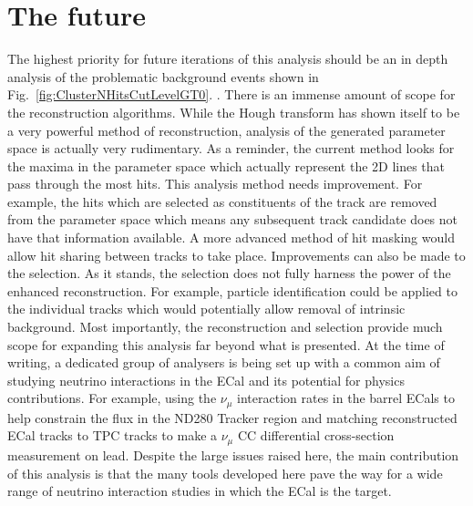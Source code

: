 \section{The future}
\label{sec:TheFuture}
The highest priority for future iterations of this analysis should be an in depth analysis of the problematic background events shown in Fig.~\ref{fig:ClusterNHitsCutLevelGT0}.  .
\newline
\newline
There is an immense amount of scope for the reconstruction algorithms.  While the Hough transform has shown itself to be a very powerful method of reconstruction, analysis of the generated parameter space is actually very rudimentary.  As a reminder, the current method looks for the maxima in the parameter space which actually represent the 2D lines that pass through the most hits.  This analysis method needs improvement.  For example, the hits which are selected as constituents of the track are removed from the parameter space which means any subsequent track candidate does not have that information available.  A more advanced method of hit masking would allow hit sharing between tracks to take place.  
\newline
\newline
Improvements can also be made to the selection.  As it stands, the selection does not fully harness the power of the enhanced reconstruction.  For example, particle identification could be applied to the individual tracks which would potentially allow removal of intrinsic background.
\newline
\newline
Most importantly, the reconstruction and selection provide much scope for expanding this analysis far beyond what is presented.  At the time of writing, a dedicated group of analysers is being set up with a common aim of studying neutrino interactions in the ECal and its potential for physics contributions.  For example, using the $\nu_\mu$ interaction rates in the barrel ECals to help constrain the flux in the ND280 Tracker region and matching reconstructed ECal tracks to TPC tracks to make a $\nu_\mu$ CC differential cross-section measurement on lead.
\newline
\newline
Despite the large issues raised here, the main contribution of this analysis is that the many tools developed here pave the way for a wide range of neutrino interaction studies in which the ECal is the target.







